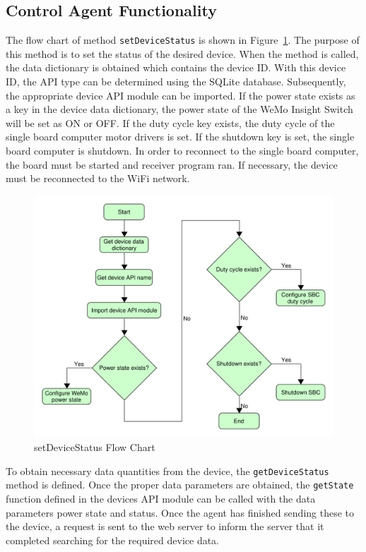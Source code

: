 \subsection{Control Agent Functionality}
The flow chart of method \texttt{setDeviceStatus} is shown in
Figure~\ref{fig:setDeviceStatus}. The purpose of this method is to set the
status of the desired device. When the method is called, the data dictionary is
obtained which contains the device ID. With this device ID, the API type can be
determined using the SQLite database. Subsequently, the appropriate device API
module can be imported. If the power state exists as a key in the device data
dictionary, the power state of the WeMo Insight Switch will be set as ON or OFF.
If the duty cycle key exists, the duty cycle of the single board computer motor
drivers is set. If the shutdown key is set, the single board computer is
shutdown. In order to reconnect to the single board computer, the board must be
started and receiver program ran. If necessary, the device must be reconnected
to the WiFi network. %
%
\begin{figure}
    \centering
    \includegraphics[scale=0.5]{figs/setDeviceStatus.pdf}
    \caption{setDeviceStatus Flow Chart}
    \label{fig:setDeviceStatus}
\end{figure}
%


To obtain necessary data quantities from the device, the
\texttt{getDeviceStatus} method is defined. Once the proper data parameters are
obtained, the \texttt{getState} function defined in the devices API module can
be called with the data parameters  power state and
status. Once the agent has finished sending these to the device, a request is
sent to the web server to inform the server that it completed searching for the
required device data. %

